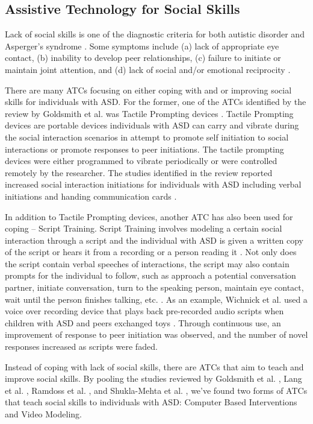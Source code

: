 \subsection{Assistive Technology for Social Skills}
Lack of social skills is one of the diagnostic criteria for both autistic disorder and Asperger's syndrome \cite{spitzer1980diagnostic}.  Some symptoms include (a) lack of appropriate eye contact, (b) inability to develop peer relationships, (c) failure to initiate or maintain joint attention, and (d) lack of social and/or emotional reciprocity \cite{rao2008social}.

There are many ATCs focusing on either coping with and or improving social skills for individuals with ASD.  For the former, one of the ATCs identified by the review by Goldsmith et al. was Tactile Prompting devices \cite{goldsmith2004use}.  Tactile Prompting devices are portable devices individuals with ASD can carry and vibrate during the social interaction scenarios in attempt to promote self initiation to social interactions or promote responses to peer initiations.  The tactile prompting devices were either programmed to vibrate periodically or were controlled remotely by the researcher.  The studies identified in the review reported increased social interaction initiations for individuals with ASD including verbal initiations \cite{shabani2002increasing, taylor1998teaching} and handing communication cards \cite{taylor2004teaching}.

In addition to Tactile Prompting devices, another ATC has also been used for coping -- Script Training.  Script Training involves modeling a certain social interaction through a script and the individual with ASD is given a written copy of the script or hears it from a recording or a person reading it \cite{stevenson2000social}.  Not only does the script contain verbal speeches of interactions, the script may also contain prompts for the individual to follow, such as approach a potential conversation partner, initiate conversation, turn to the speaking person, maintain eye contact, wait until the person finishes talking, etc. \cite{wichnick2010effect}.  As an example, Wichnick et al. used a voice over recording device that plays back pre-recorded audio scripts when children with ASD and peers exchanged toys \cite{wichnick2010effect}.  Through continuous use, an improvement of response to peer initiation was observed, and the number of novel responses increased as scripts were faded.

Instead of coping with lack of social skills, there are ATCs that aim to teach and improve social skills.  By pooling the studies reviewed by Goldsmith et al. \cite{goldsmith2004use}, Lang et al. \cite{lang2014assistive}, Ramdoss et al. \cite{ramdoss2012computer}, and  Shukla-Mehta et al. \cite{shukla2009evaluating}, we've found two forms of ATCs that teach social skills to individuals with ASD: Computer Based Interventions and Video Modeling.

